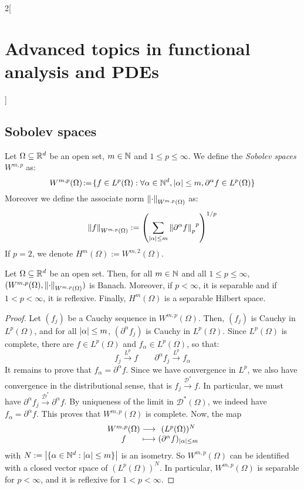 \documentclass[../../../main_math.tex]{subfiles}
\begin{document}
\begin{multicols}{2}[\section{Advanced topics in functional analysis and PDEs}]
  \subsection{Sobolev spaces}
  \begin{definition}
    Let $\Omega\subseteq \mathbb{R}^d$ be an open set, $m\in\mathbb{N}$ and $1\leq p\leq \infty$. We define the \emph{Sobolev spaces} $W^{m,p}$ as:
    $$
      W^{m,p}(\Omega)\!:=\!\{f\in L^p(\Omega): \forall\alpha\in\mathbb{N}^d, \abs{\alpha}\leq m, \partial^\alpha f\in L^p(\Omega)\}
    $$
    Moreover we define the associate norm $\left\|\cdot\right\|_{W^{m,p}(\Omega)}$ as:
    $$
      \left\|f\right\|_{W^{m,p}(\Omega)}:={\left(\sum_{\abs{\alpha}\leq m}{\left\|\partial^\alpha f\right\|_p}^p\right)}^{1/p}
    $$
    If $p=2$, we denote $H^m(\Omega):=W^{m,2}(\Omega)$.
  \end{definition}
  \begin{theorem}
    Let $\Omega\subseteq \mathbb{R}^d$ be an open set. Then, for all $m\in\mathbb{N}$ and all $1\leq p\leq \infty$, $(W^{m,p}(\Omega),\left\|\cdot\right\|_{W^{m,p}(\Omega)})$ is Banach. Moreover, if $p<\infty$, it is separable and if $1<p<\infty$, it is reflexive. Finally, $H^m(\Omega)$ is a separable Hilbert space.
  \end{theorem}
  \begin{proof}
    Let $(f_j)$ be a Cauchy sequence in $W^{m,p}(\Omega)$. Then, $(f_j)$ is Cauchy in $L^p(\Omega)$, and for all $\abs{\alpha}\leq m$, $(\partial^\alpha f_j)$ is Cauchy in $L^p(\Omega)$. Since $L^p(\Omega)$ is complete, there are $f\in L^p(\Omega)$ and $f_\alpha\in L^p(\Omega)$, so that:
    $$
      f_j\overset{L^p}\longrightarrow f\qquad\partial^\alpha f_j\overset{L^p}\longrightarrow f_\alpha
    $$
    It remains to prove that $f_\alpha=\partial^\alpha f$. Since we have convergence in $L^p$, we also have convergence in the distributional sense, that is $f_j\overset{\mathcal{D}^*}\to f$. In particular, we must have $\partial^\alpha f_j\overset{\mathcal{D}^*}\to \partial^\alpha f$. By uniqueness of the limit in $\mathcal{D}^*(\Omega)$, we indeed have $f_\alpha=\partial^\alpha f$. This proves that $W^{m,p}(\Omega)$ is complete. Now, the map
    $$
      \function{}{W^{m,p}(\Omega)}{(L^p(\Omega))^N}{f}{(\partial^\alpha f)_{\abs{\alpha}\leq m}}
    $$
    with $N:=\abs{\{\alpha\in\mathbb{N}^d:\abs{\alpha}\leq m\}}$ is an isometry. So $W^{m,p}(\Omega)$ can be identified with a closed vector space of $(L^p(\Omega))^N$. In particular, $W^{m,p}(\Omega)$ is separable for $p<\infty$, and it is reflexive for $1<p<\infty$.
  \end{proof}

\end{multicols}
\end{document}
